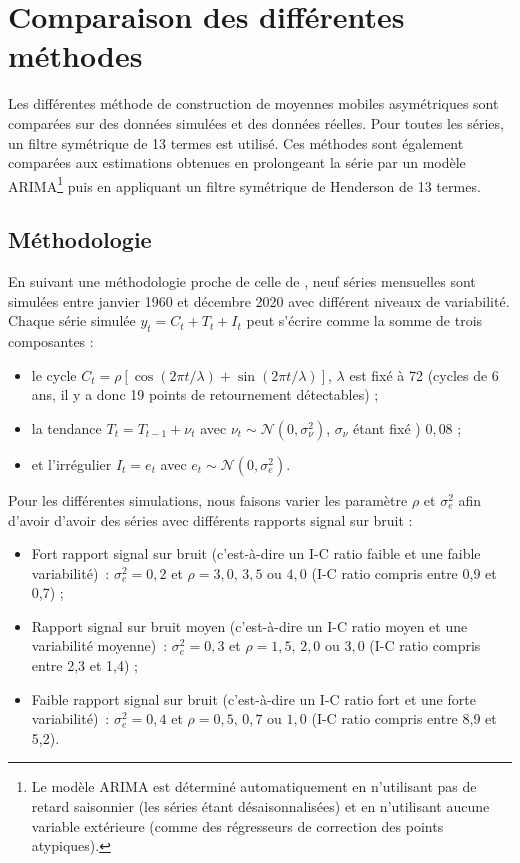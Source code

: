 \documentclass[
  12pt,
  french,
  12pt,a4paper]{article}
\newcommand\1{\mathds{1}}
\begin{document}
\hypertarget{sec-comparison}{%
\section{Comparaison des différentes méthodes}\label{sec-comparison}}

Les différentes méthode de construction de moyennes mobiles asymétriques sont comparées sur des données simulées et des données réelles.
Pour toutes les séries, un filtre symétrique de 13 termes est utilisé.
Ces méthodes sont également comparées aux estimations obtenues en prolongeant la série par un modèle ARIMA\footnote{Le modèle ARIMA est déterminé automatiquement en n'utilisant pas de retard saisonnier (les séries étant désaisonnalisées) et en n'utilisant aucune variable extérieure (comme des régresseurs de correction des points atypiques).} puis en appliquant un filtre symétrique de Henderson de 13 termes.

\hypertarget{muxe9thodologie}{%
\subsection{Méthodologie}\label{muxe9thodologie}}

En suivant une méthodologie proche de celle de \textcite{DarneDagum2009}, neuf séries mensuelles sont simulées entre janvier 1960 et décembre 2020 avec différent niveaux de variabilité. Chaque série simulée \(y_t= C_t+ T_t + I_t\) peut s'écrire comme la somme de trois composantes :

\begin{itemize}
\item
  le cycle \(C_t = \rho [\cos (2 \pi t / \lambda) +\sin (2 \pi t / \lambda)]\), \(\lambda\) est fixé à 72 (cycles de 6 ans, il y a donc 19 points de retournement détectables) ;
\item
  la tendance \(T_t = T_{t-1} + \nu_t\) avec \(\nu_t \sim \mathcal{N}(0, \sigma_\nu^2)\), \(\sigma_\nu\) étant fixé ) \(0,08\) ;
\item
  et l'irrégulier \(I_t = e_t\) avec \(e_t \sim \mathcal{N}(0, \sigma_e^2)\).
\end{itemize}

Pour les différentes simulations, nous faisons varier les paramètre \(\rho\) et \(\sigma_e^2\) afin d'avoir d'avoir des séries avec différents rapports signal sur bruit :

\begin{itemize}
\item
  Fort rapport signal sur bruit (c'est-à-dire un I-C ratio faible et une faible variabilité)~: \(\sigma_e^2=0,2\) et \(\rho = 3,0,\, 3,5\) ou \(4,0\) (I-C ratio compris entre 0,9 et 0,7) ;
\item
  Rapport signal sur bruit moyen (c'est-à-dire un I-C ratio moyen et une variabilité moyenne)~: \(\sigma_e^2=0,3\) et \(\rho = 1,5,\, 2,0\) ou \(3,0\) (I-C ratio compris entre 2,3 et 1,4) ;
\item
  Faible rapport signal sur bruit (c'est-à-dire un I-C ratio fort et une forte variabilité)~: \(\sigma_e^2=0,4\) et \(\rho = 0,5,\, 0,7\) ou \(1,0\) (I-C ratio compris entre 8,9 et 5,2).
\end{itemize}
\end{document}
